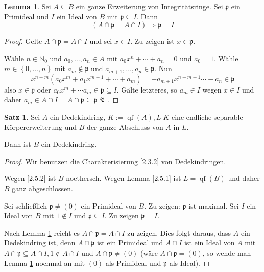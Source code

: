 \documentclass[
twoside=semi,
fontsize=12,
DIV=12, 
cleardoublepage=current,
leqno,
headings=optiontoheadandtoc, 
toc=idx
]{scrbook}
\newcommand{\N}{\mathbb{N}}
\newcommand{\set}[1]{\left\{ #1 \right\}}
\DeclareMathOperator{\qf}{qf}
\theoremstyle{definition}
\newtheorem{satz}[definition]{Satz}
\newtheorem{lemma}[definition]{Lemma}
\begin{document}
 	\begin{lemma}\label{2.5.3}\hfill\newline
 		Sei $A \subseteq B$ ein ganze Erweiterung von Integrit\"atsringe. Sei $\mathfrak{p}$ ein Primideal und $I$ ein Ideal von $B$ mit $\mathfrak{p} \subseteq I$. Dann 
 		\[(A \cap \mathfrak{p} = A \cap I) \Longrightarrow \mathfrak{p} = I\]
 		
 		\begin{proof}
 			Gelte $A \cap \mathfrak{p} = A \cap I$ und sei $x \in I$. Zu zeigen ist $x \in \mathfrak{p}$.
 			
 			W\"ahle $n \in \N_0$ und $a_0, \dots, a_n \in A$ mit $a_0x^n + \cdots + a_n = 0$ und $a_0 = 1$. W\"ahle $m \in \set{0, \dots, n}$ mit $a_m \notin \mathfrak{p}$ und $a_{m+1}, \dots, a_n \in \mathfrak{p}$. Nun 
 			\[x^{n-m}(a_0x^m + a_1x^{m-1} + \cdots + a_m) = -a_{m+1}x^{n-m-1} \cdots - a_n \in \mathfrak{p}\]
 			also $x \in \mathfrak{p}$ oder $a_0x^m + \cdots a_m \in \mathfrak{p} \subseteq I$. G\"alte letzteres, so $a_m \in I$ wegen $x \in I$ und daher $a_m \in A \cap I = A \cap \mathfrak{p} \subseteq \mathfrak{p}\lightning$.
 		\end{proof}
 	\end{lemma}
 
 	\begin{satz}\label{2.5.4}\hfill\newline
 		Sei $A$ ein Dedekindring, $K:= \qf(A), L|K$ eine endliche separable K\"orpererweiterung und $B$ der ganze Abschluss von $A$ in $L$. 
 		
 		\medskip\noindent 
 		Dann ist $B$ ein Dedekindring.
 		
 		\begin{proof}
 			Wir benutzen die Charakterisierung \ref{2.3.2} von Dedekindringen.
 			
 			Wegen \ref{2.5.2} ist $B$ noethersch. Wegen Lemma \ref{2.5.1} ist $L = \qf(B)$ und daher $B$ ganz abgeschlossen.
 			
 			Sei schlie\ss lich $\mathfrak{p} \neq (0)$ ein Primideal von $B$. Zu zeigen: $\mathfrak{p}$ ist maximal. Sei $I$ ein Ideal von $B$ mit $1 \notin I$ und $\mathfrak{p} \subseteq I$. Zu zeigen $\mathfrak{p} = I$.
 			
 			Nach Lemma \ref{2.5.3} reicht es $A \cap \mathfrak{p} = A \cap I$ zu zeigen. Dies folgt daraus, dass $A$ ein Dedekindring ist, denn $A \cap \mathfrak{p}$ ist ein Primideal und $A \cap I$ ist ein Ideal von $A$ mit $A \cap \mathfrak{p} \subseteq A \cap I, 1 \notin A \cap I$ und $A \cap \mathfrak{p} \neq (0)$ (w\"are $A \cap \mathfrak{p} = (0)$, so wende man Lemma \ref{2.5.3} nochmal an mit $(0)$ als Primideal und $\mathfrak{p}$ als Ideal).
 		\end{proof}
 	\end{satz}
 
\end{document}
